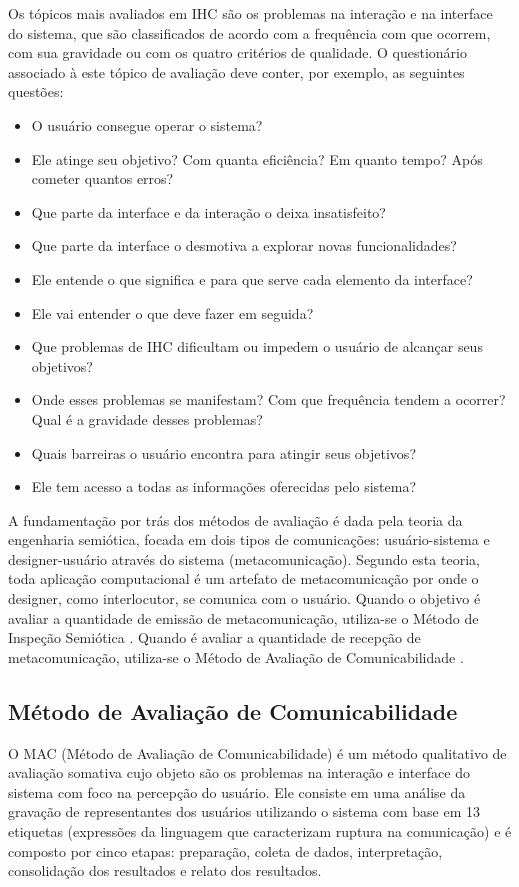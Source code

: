 \indent Os tópicos mais avaliados em IHC são os problemas na interação e na interface do sistema, que são classificados de acordo com a frequência com que ocorrem, com sua gravidade ou com os quatro critérios de qualidade. O questionário associado à este tópico de avaliação deve conter, por exemplo, as seguintes questões: \cite[p. 293]{IHCbook}
\begin{itemize}
\item O usuário consegue operar o sistema?
\item Ele atinge seu objetivo? Com quanta eficiência? Em quanto tempo? Após cometer quantos erros?
\item Que parte da interface e da interação o deixa insatisfeito?
\item Que parte da interface o desmotiva a explorar novas funcionalidades?
\item Ele entende o que significa e para que serve cada elemento da interface?
\item Ele vai entender o que deve fazer em seguida?
\item Que problemas de IHC dificultam ou impedem o usuário de alcançar seus objetivos?
\item Onde esses problemas se manifestam? Com que frequência tendem a ocorrer? Qual é a gravidade desses problemas?
\item Quais barreiras o usuário encontra para atingir seus objetivos?
\item Ele tem acesso a todas as informações oferecidas pelo sistema?
\end{itemize}

\indent A fundamentação por trás dos métodos de avaliação é dada pela teoria da engenharia semiótica, focada em dois tipos de comunicações: usuário-sistema e designer-usuário através do sistema (metacomunicação). Segundo esta teoria, toda aplicação computacional é um artefato de metacomunicação por onde o designer, como interlocutor, se comunica com o usuário. Quando o objetivo é avaliar a quantidade de emissão de metacomunicação, utiliza-se o Método de Inspeção Semiótica \cite[p. 330]{IHCbook}. Quando é avaliar a quantidade de recepção de metacomunicação, utiliza-se o Método de Avaliação de Comunicabilidade \cite[p. 344]{IHCbook}. 

\subsection{Método de Avaliação de Comunicabilidade}

\indent O MAC (Método de Avaliação de Comunicabilidade) é um método qualitativo de avaliação somativa cujo objeto são os problemas na interação e interface do sistema com foco na percepção do usuário. Ele consiste em uma análise da gravação de representantes dos usuários utilizando o sistema com base em 13 etiquetas (expressões da linguagem que caracterizam ruptura na comunicação) e é composto por cinco etapas: preparação, coleta de dados, interpretação, consolidação dos resultados e relato dos resultados.

